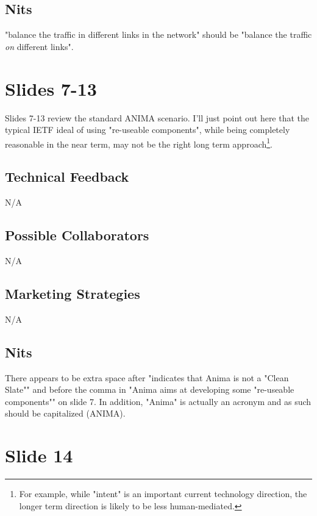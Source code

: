 \documentclass[11pt, oneside]{article}   	%
\begin{document}
\subsection{Nits}
\label{slide5:nits}
"balance the traffic in different links in the network" should be "balance the traffic \emph{on} different links".


\section{Slides 7-13}
\label{sec:slide7-13}

Slides 7-13 review the standard ANIMA scenario. I'll just point out here that the typical IETF ideal of using "re-useable components", while being
completely reasonable in the near term,  may not be the right long term approach\footnote{For example, while "intent" is an important current
technology direction, the longer term direction is likely to be less human-mediated.}.


\subsection{Technical Feedback}
\label{slide7:technical_feedback}
N/A

\subsection{Possible Collaborators}
\label{slide7:possible_collaborators}
N/A

\subsection{Marketing Strategies}
\label{slide7:marketing_strategies}
N/A

\subsection{Nits}
\label{slide7:nits}

There appears to be extra space after "indicates that Anima is not a "Clean Slate"" and 
before the comma in "Anima aims at developing some "re-useable components"" on slide 7. In addition, "Anima" is 
actually an acronym and as such should be capitalized (ANIMA). 

\section{Slide 14}
\label{sec:slide14}
\end{document}

